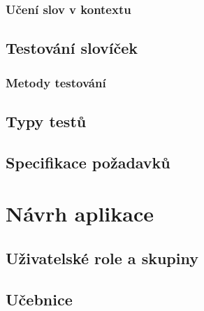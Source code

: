\documentclass[a4paper,11pt,titlepage,fleqn]{article}
\begin{document}
        \subsubsection{Učení slov v kontextu}
    
    \subsection{Testování slovíček}

        \subsubsection{Metody testování}

        \subsection{Typy testů}
    

    \subsection{Specifikace požadavků}

\newpage
\section{Návrh aplikace}

    \subsection{Uživatelské role a skupiny}
    
    \subsection{Učebnice}
\end{document}
